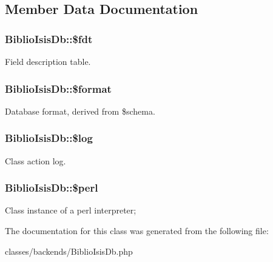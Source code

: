 \subsection{Member Data Documentation}
\hypertarget{classBiblioIsisDb_a978a9243ea53b1f2426115d7b4191b07}{
\subsubsection[{\$fdt}]{\setlength{\rightskip}{0pt plus 5cm}BiblioIsisDb::\$fdt}}
\label{classBiblioIsisDb_a978a9243ea53b1f2426115d7b4191b07}
Field description table. \hypertarget{classBiblioIsisDb_ab9fb3b6f10d2734a198ca7802ee38c2d}{
\subsubsection[{\$format}]{\setlength{\rightskip}{0pt plus 5cm}BiblioIsisDb::\$format}}
\label{classBiblioIsisDb_ab9fb3b6f10d2734a198ca7802ee38c2d}
Database format, derived from \$schema. \hypertarget{classBiblioIsisDb_a67337d78af0fc21d0ff10471aa638c62}{
\subsubsection[{\$log}]{\setlength{\rightskip}{0pt plus 5cm}BiblioIsisDb::\$log}}
\label{classBiblioIsisDb_a67337d78af0fc21d0ff10471aa638c62}
Class action log. \hypertarget{classBiblioIsisDb_a7eccfa964dcd1469a263340447c38143}{
\subsubsection[{\$perl}]{\setlength{\rightskip}{0pt plus 5cm}BiblioIsisDb::\$perl}}
\label{classBiblioIsisDb_a7eccfa964dcd1469a263340447c38143}
Class instance of a perl interpreter; 

The documentation for this class was generated from the following file:\begin{DoxyCompactItemize}
\item 
classes/backends/BiblioIsisDb.php\end{DoxyCompactItemize}
